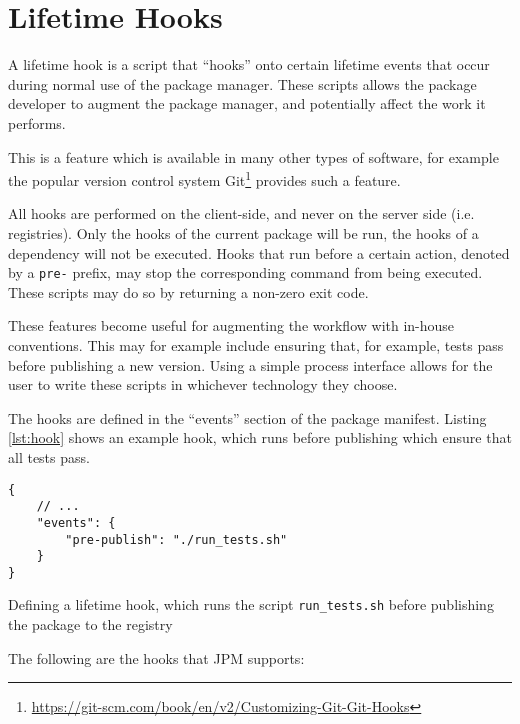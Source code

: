 \section{Lifetime Hooks}

A lifetime hook is a script that ``hooks'' onto certain lifetime events that
occur during normal use of the package manager. These scripts allows the
package developer to augment the package manager, and potentially affect the
work it performs.

This is a feature which is available in many other types of software, for
example the popular version control system
Git\footnote{\url{https://git-scm.com/book/en/v2/Customizing-Git-Git-Hooks}}
provides such a feature.

All hooks are performed on the client-side, and never on the server side (i.e.
registries). Only the hooks of the current package will be run, the
hooks of a dependency will not be executed. Hooks that run before a certain
action, denoted by a \verb!pre-! prefix, may stop the corresponding command
from being executed.  These scripts may do so by returning a non-zero exit
code.

These features become useful for augmenting the workflow with in-house
conventions. This may for example include ensuring that, for example, tests
pass before publishing a new version. Using a simple process interface allows
for the user to write these scripts in whichever technology they choose.

The hooks are defined in the ``events'' section of the package manifest.
Listing \ref{lst:hook} shows an example hook, which runs before publishing
which ensure that all tests pass.

\begin{listing}[H]
\begin{verbatim}
{
    // ...
    "events": {
        "pre-publish": "./run_tests.sh"
    }
}
\end{verbatim}

\caption{Defining a lifetime hook, which runs the script
    \texttt{run_tests.sh} before publishing the package to the
        registry}

\label{lst:hook}

\end{listing}

The following are the hooks that JPM supports:

